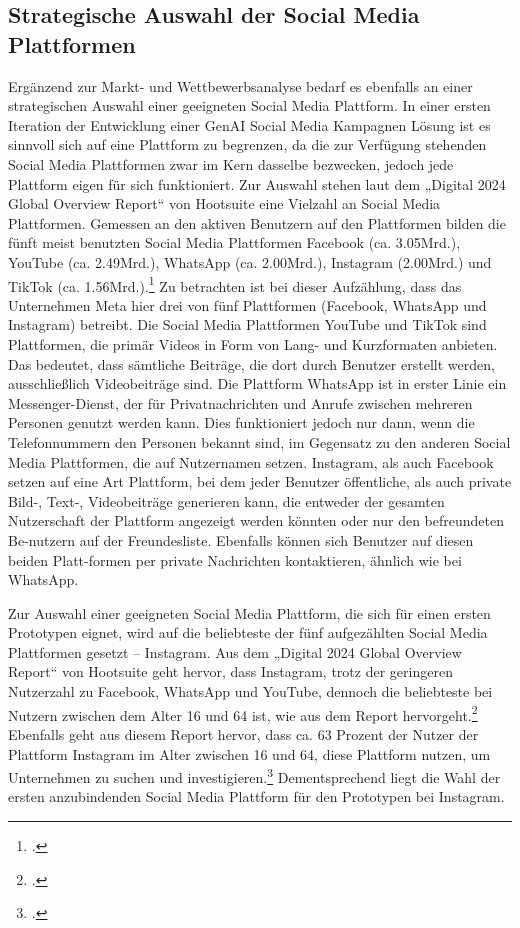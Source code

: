 \subsection{Strategische Auswahl der Social Media Plattformen}
Ergänzend zur Markt- und Wettbewerbsanalyse bedarf es ebenfalls an einer strategischen Auswahl einer geeigneten Social Media Plattform.
In einer ersten Iteration der Entwicklung einer GenAI Social Media Kampagnen Lösung ist es sinnvoll sich auf eine Plattform zu begrenzen, da die zur Verfügung stehenden Social Media Plattformen zwar im Kern dasselbe bezwecken, jedoch jede Plattform eigen für sich funktioniert.
Zur Auswahl stehen laut dem „Digital 2024 Global Overview Report“ von Hootsuite eine Vielzahl an Social Media Plattformen.
Gemessen an den aktiven Benutzern auf den Plattformen bilden die fünft meist benutzten Social Media Plattformen Facebook (ca. 3.05Mrd.), YouTube (ca. 2.49Mrd.), WhatsApp (ca. 2.00Mrd.), Instagram (2.00Mrd.) und TikTok (ca. 1.56Mrd.).\footcite{hootsuite_digital_2024_page_232}
Zu betrachten ist bei dieser Aufzählung, dass das Unternehmen Meta hier drei von fünf Plattformen (Facebook, WhatsApp und Instagram) betreibt.
Die Social Media Plattformen YouTube und TikTok sind Plattformen, die primär Videos in Form von Lang- und Kurzformaten anbieten.
Das bedeutet, dass sämtliche Beiträge, die dort durch Benutzer erstellt werden, ausschließlich Videobeiträge sind.
Die Plattform WhatsApp ist in erster Linie ein Messenger-Dienst, der für Privatnachrichten und Anrufe zwischen mehreren Personen genutzt werden kann.
Dies funktioniert jedoch nur dann, wenn die Telefonnummern den Personen bekannt sind, im Gegensatz zu den anderen Social Media Plattformen, die auf Nutzernamen setzen.
Instagram, als auch Facebook setzen auf eine Art Plattform, bei dem jeder Benutzer öffentliche, als auch private Bild-, Text-, Videobeiträge generieren kann, die entweder der gesamten Nutzerschaft der Plattform angezeigt werden könnten oder nur den befreundeten Be-nutzern auf der Freundesliste.
Ebenfalls können sich Benutzer auf diesen beiden Platt-formen per private Nachrichten kontaktieren, ähnlich wie bei WhatsApp.

Zur Auswahl einer geeigneten Social Media Plattform, die sich für einen ersten Prototypen eignet, wird auf die beliebteste der fünf aufgezählten Social Media Plattformen gesetzt – Instagram.
Aus dem „Digital 2024 Global Overview Report“ von Hootsuite geht hervor, dass Instagram, trotz der geringeren Nutzerzahl zu Facebook, WhatsApp und YouTube, dennoch die beliebteste bei Nutzern zwischen dem Alter 16 und 64 ist, wie aus dem Report hervorgeht.\footcite{hootsuite_digital_2024_page_236}
Ebenfalls geht aus diesem Report hervor, dass ca. 63 Prozent der Nutzer der Plattform Instagram im Alter zwischen 16 und 64, diese Plattform nutzen, um Unternehmen zu suchen und investigieren.\footcite{hootsuite_digital_2024_page_250}
Dementsprechend liegt die Wahl der ersten anzubindenden Social Media Plattform für den Prototypen bei Instagram.


